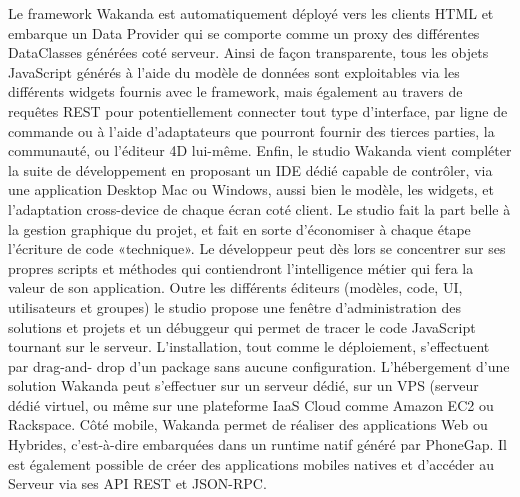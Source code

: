 Le framework Wakanda est automatiquement déployé vers les clients HTML et embarque un Data Provider qui se comporte comme un proxy des différentes DataClasses générées coté serveur. Ainsi de façon transparente, tous les objets JavaScript générés à l’aide du modèle de données sont exploitables via les différents widgets fournis avec le framework, mais également au travers de requêtes REST pour potentiellement connecter tout type d’interface, par ligne de commande ou à l’aide d’adaptateurs que pourront fournir des tierces parties, la communauté, ou l’éditeur 4D lui-même.
Enfin, le studio Wakanda vient compléter la suite de développement en proposant un IDE dédié capable de contrôler, via une application Desktop Mac ou Windows, aussi bien le modèle, les widgets, et l’adaptation cross-device de chaque écran coté client. Le studio fait la part belle à la gestion graphique du projet, et fait en sorte d’économiser à chaque étape l’écriture de code «technique». Le développeur peut dès lors se concentrer sur ses propres scripts et méthodes qui contiendront l’intelligence métier qui fera la valeur de son application. Outre les différents éditeurs (modèles, code, UI, utilisateurs et groupes) le studio propose une fenêtre d’administration des solutions et projets et un débuggeur qui permet de tracer le code JavaScript tournant sur le serveur. L’installation, tout comme le déploiement, s’effectuent par drag-and- drop d’un package sans aucune configuration. L’hébergement d’une solution Wakanda peut s’effectuer sur un serveur dédié, sur un VPS (serveur dédié virtuel, ou même sur une plateforme IaaS Cloud comme Amazon EC2 ou Rackspace. Côté mobile, Wakanda permet de réaliser des applications Web ou Hybrides, c’est-à-dire embarquées dans un runtime natif généré par PhoneGap. Il est également possible de créer des applications mobiles natives et d’accéder au Serveur via ses API REST et JSON-RPC.
